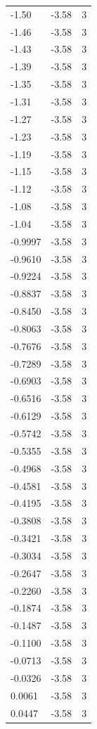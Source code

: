 \begin{longtable}{lrr}
  -1.50 & -3.58 & 3 \\
  -1.46 & -3.58 & 3 \\
  -1.43 & -3.58 & 3 \\
  -1.39 & -3.58 & 3 \\
  -1.35 & -3.58 & 3 \\
  -1.31 & -3.58 & 3 \\
  -1.27 & -3.58 & 3 \\
  -1.23 & -3.58 & 3 \\
  -1.19 & -3.58 & 3 \\
  -1.15 & -3.58 & 3 \\
  -1.12 & -3.58 & 3 \\
  -1.08 & -3.58 & 3 \\
  -1.04 & -3.58 & 3 \\
  -0.9997 & -3.58 & 3 \\
  -0.9610 & -3.58 & 3 \\
  -0.9224 & -3.58 & 3 \\
  -0.8837 & -3.58 & 3 \\
  -0.8450 & -3.58 & 3 \\
  -0.8063 & -3.58 & 3 \\
  -0.7676 & -3.58 & 3 \\
  -0.7289 & -3.58 & 3 \\
  -0.6903 & -3.58 & 3 \\
  -0.6516 & -3.58 & 3 \\
  -0.6129 & -3.58 & 3 \\
  -0.5742 & -3.58 & 3 \\
  -0.5355 & -3.58 & 3 \\
  -0.4968 & -3.58 & 3 \\
  -0.4581 & -3.58 & 3 \\
  -0.4195 & -3.58 & 3 \\
  -0.3808 & -3.58 & 3 \\
  -0.3421 & -3.58 & 3 \\
  -0.3034 & -3.58 & 3 \\
  -0.2647 & -3.58 & 3 \\
  -0.2260 & -3.58 & 3 \\
  -0.1874 & -3.58 & 3 \\
  -0.1487 & -3.58 & 3 \\
  -0.1100 & -3.58 & 3 \\
  -0.0713 & -3.58 & 3 \\
  -0.0326 & -3.58 & 3 \\
  0.0061 & -3.58 & 3 \\
  0.0447 & -3.58 & 3 \\

\end{longtable}
